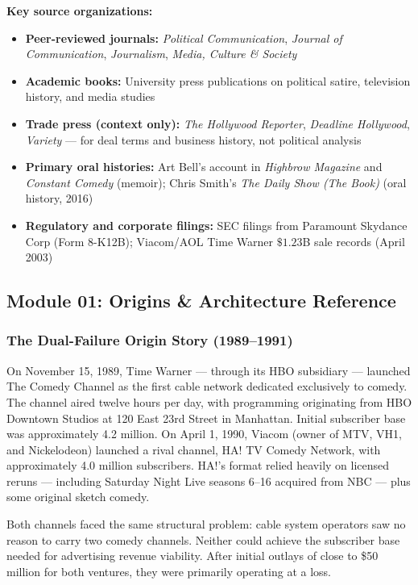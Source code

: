 \documentclass[11pt,letterpaper]{article}
\begin{document}
\textbf{Key source organizations:}
\begin{itemize}[leftmargin=*]
  \item \textbf{Peer-reviewed journals:} \textit{Political Communication}, \textit{Journal of Communication}, \textit{Journalism}, \textit{Media, Culture \& Society}
  \item \textbf{Academic books:} University press publications on political satire, television history, and media studies
  \item \textbf{Trade press (context only):} \textit{The Hollywood Reporter}, \textit{Deadline Hollywood}, \textit{Variety} --- for deal terms and business history, not political analysis
  \item \textbf{Primary oral histories:} Art Bell's account in \textit{Highbrow Magazine} and \textit{Constant Comedy} (memoir); Chris Smith's \textit{The Daily Show (The Book)} (oral history, 2016)
  \item \textbf{Regulatory and corporate filings:} SEC filings from Paramount Skydance Corp (Form 8-K12B); Viacom/AOL Time Warner $\$1.23$B sale records (April 2003)
\end{itemize}

\subsection{Module 01: Origins \& Architecture Reference}

\subsubsection{The Dual-Failure Origin Story (1989--1991)}

On November 15, 1989, Time Warner --- through its HBO subsidiary --- launched The Comedy Channel as the first cable network dedicated exclusively to comedy. The channel aired twelve hours per day, with programming originating from HBO Downtown Studios at 120 East 23rd Street in Manhattan. Initial subscriber base was approximately 4.2 million. On April 1, 1990, Viacom (owner of MTV, VH1, and Nickelodeon) launched a rival channel, HA! TV Comedy Network, with approximately 4.0 million subscribers. HA!'s format relied heavily on licensed reruns --- including Saturday Night Live seasons 6--16 acquired from NBC --- plus some original sketch comedy.

Both channels faced the same structural problem: cable system operators saw no reason to carry two comedy channels. Neither could achieve the subscriber base needed for advertising revenue viability. After initial outlays of close to \$50 million for both ventures, they were primarily operating at a loss.
\end{document}
